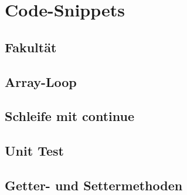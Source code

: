 \section{Code-Snippets}

\subsection{Fakultät}
    

\subsection{Array-Loop}{\label{Array-Loop}}
    

\subsection{Schleife mit continue}

\subsection{Unit Test}{\label{Unit-Test}}

\subsection{Getter- und Settermethoden}{\label{GetSet}}
